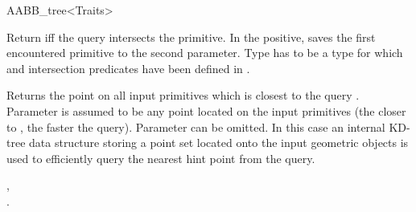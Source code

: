 \begin{ccRefClass}{AABB_tree<Traits>}
	
{Return  iff the query intersects the primitive. In the positive, saves the first encountered primitive to the second parameter. Type  has to be a type for which  and intersection predicates have been defined in .}


{Returns the point on all input primitives which is closest to the query . Parameter  is assumed to be any point located on the input primitives (the closer  to , the faster the query). Parameter  can be omitted. In this case an internal KD-tree data structure storing a point set located onto the input geometric objects is used to efficiently query the nearest hint point from the query.}

\ccSeeAlso

, \\
.

\end{ccRefClass}

\ccRefPageEnd

